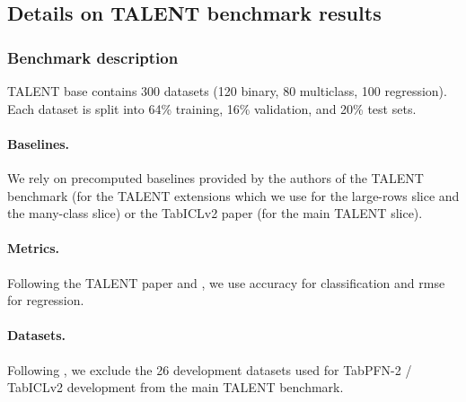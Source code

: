\begin{table}[H]
\centering
\caption{\textbf{TabArena-classification leaderboard on the 38 classification datasets in TabArena.}}
\label{tab:tabarena_classification_table}

\end{table}

\begin{table}[H]
\centering
\caption{\textbf{TabArena-regression leaderboard on the 13 regression datasets in TabArena.}}
\label{tab:tabarena_regression_table}

\end{table}


\subsection{Details on TALENT benchmark results}
\label{app:TALENT}

\subsubsection{Benchmark description}
TALENT \citep{talent_benchmark_jmlr} base contains 300 datasets (120 binary, 80 multiclass, 100 regression).
Each dataset is split into 64\% training, 16\% validation, and 20\% test sets.


\paragraph{Baselines.} We rely on precomputed baselines provided by the authors of
the TALENT benchmark \citep{talent_benchmark_jmlr} (for the TALENT extensions which we
use for the large-rows slice and the many-class slice) or the TabICLv2 paper
\citep{qu2026tabiclv2} (for the main TALENT slice).

\paragraph{Metrics.} Following the TALENT paper and \cite{qu2026tabiclv2}, we use accuracy for classification and rmse for regression.

\paragraph{Datasets.} Following \cite{qu2026tabiclv2}, we exclude the 26 development datasets used for
TabPFN-2 / TabICLv2 development from the main TALENT benchmark.


